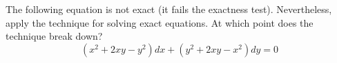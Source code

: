\begin{question}
The following equation is not exact (it fails the exactness test). Nevertheless, apply the technique for solving exact equations. At which point does the technique break down?
  \[
    (x^{2} + 2xy -y^{2}) dx + (y^{2} + 2xy - x^{2})dy = 0
  \]
\end{question}











